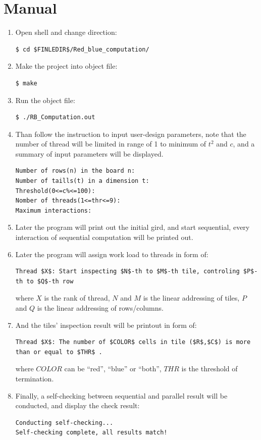 \documentclass[12pt]{article}
\begin{document}
\section{Manual}
\begin{enumerate}
    \item Open shell and change direction:
\begin{lstlisting}[style = bash]    
$ cd $FINLEDIR$/Red_blue_computation/
\end{lstlisting}
    \item Make the project into object file:
\begin{lstlisting}[style = bash]    
$ make
\end{lstlisting}
    \item Run the object file:
\begin{lstlisting}[style = bash]    
$ ./RB_Computation.out
\end{lstlisting}    
    \item Than follow the instruction to input user-design parameters, note that the number of thread will be limited in range of 1 to minimum of $t^2$ and $c$, and a summary of input parameters will be displayed.
\begin{lstlisting}[style = bash]    
Number of rows(n) in the board n:
Number of taills(t) in a dimension t:
Threshold(0<=c%<=100):
Nomber of threads(1<=thr<=9):
Maximum interactions:
\end{lstlisting}
    \item Later the program will print out the initial gird, and start sequential, every interaction of sequential computation will be printed out.
    \item Later the program will assign work load to threads in form of:
\begin{lstlisting}[style = bash]    
 Thread $X$: Start inspecting $N$-th to $M$-th tile, controling $P$-th to $Q$-th row
\end{lstlisting}
where $X$ is the rank of thread, $N$ and $M$ is the linear addressing of tiles, $P$ and $Q$ is the linear addressing of rows/columns.
    \item And the tiles' inspection result will be printout in form of:
\begin{lstlisting}[style = bash]    
Thread $X$: The number of $COLOR$ cells in tile ($R$,$C$) is more than or equal to $THR$ .
\end{lstlisting}
where $COLOR$ can be ``red'', ``blue'' or ``both'', $THR$  is the threshold of termination.
    \item Finally, a self-checking between sequential and parallel result will be conducted, and display the check result:
\begin{lstlisting}[style = bash]    
Conducting self-checking...
Self-checking complete, all results match!
\end{lstlisting}
\end{enumerate}
\end{document}
